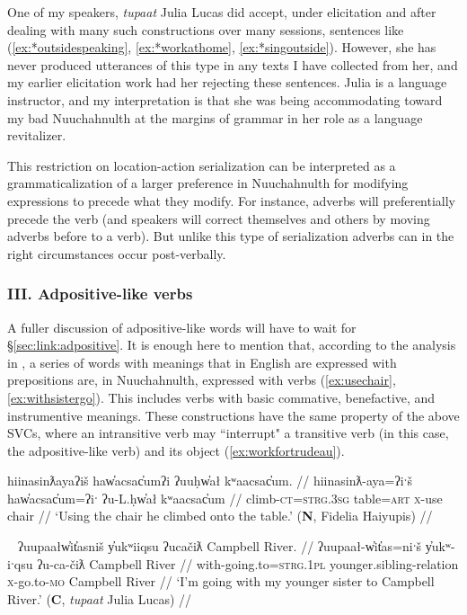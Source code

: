 One of my speakers, \textit{tupaat} Julia Lucas did accept, under elicitation and after dealing with many such constructions over many sessions, sentences like (\ref{ex:*outsidespeaking}, \ref{ex:*workathome}, \ref{ex:*singoutside}). However, she has never produced utterances of this type in any texts I have collected from her, and my earlier elicitation work had her rejecting these sentences. Julia is a language instructor, and my interpretation is that she was being accommodating toward my bad Nuuchahnulth at the margins of grammar in her role as a language revitalizer.

This restriction on location-action serialization can be interpreted as a grammaticalization of a larger preference in Nuuchahnulth for modifying expressions to precede what they modify. For instance, adverbs will preferentially precede the verb (and speakers will correct themselves and others by moving adverbs before to a verb). But unlike this type of serialization adverbs can in the right circumstances occur post-verbally.

\vspace{10pt}

\subsubsection{III. Adpositive-like verbs}

\vspace{10pt}

A fuller discussion of adpositive-like words will have to wait for \S\ref{sec:link:adpositive}. It is enough here to mention that, according to the analysis in \citep{woo2007b}, a series of words with meanings that in English are expressed with prepositions are, in Nuuchahnulth, expressed with verbs (\ref{ex:usechair}, \ref{ex:withsistergo}). This includes verbs with basic commative, benefactive, and instrumentive meanings. These constructions have the same property of the above SVCs, where an intransitive verb may ``interrupt" a transitive verb (in this case, the adpositive-like verb) and its object (\ref{ex:workfortrudeau}).


\ex \label{ex:usechair}
\begingl
\glpreamble hiinasinƛayaʔiš haw̓acsac̓umʔi ʔuuḥw̓ał kʷaacsac̓um. //
\gla hiinasinƛ-aya=ʔiˑš haw̓acsac̓um=ʔiˑ ʔu-L.ḥw̓ał kʷaacsac̓um //
\glb climb-\textsc{ct}=\textsc{strg.3sg} table=\textsc{art} \textsc{x}-use chair //
\glft `Using the chair he climbed onto the table.' (\textbf{N}, Fidelia Haiyupis) //
\endgl
\xe

\ex~ \label{ex:withsistergo}
\begingl
\glpreamble ʔuupaałw̓it̓asniš y̓ukʷiiqsu ʔucačiƛ Campbell River. //
\gla ʔuupaał-w̓it̓as=niˑš y̓ukʷ-iˑqsu ʔu-ca-čiƛ Campbell River //
\glb with-going.to=\textsc{strg.1pl} younger.sibling-relation \textsc{x}-go.to-\textsc{mo} Campbell River //
\glft `I'm going with my younger sister to Campbell River.' (\textbf{C}, \textit{tupaat} Julia Lucas) //
\endgl
\xe

